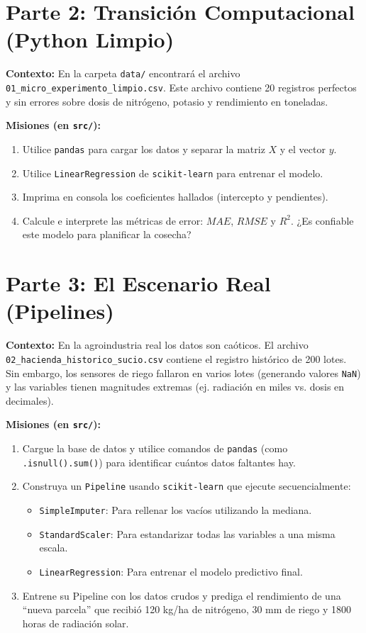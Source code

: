 \documentclass[12pt,a4paper]{article}
\begin{document}
\vspace{1cm}

\section{Parte 2: Transición Computacional (Python Limpio)}

\textbf{Contexto:} En la carpeta \texttt{data/} encontrará el archivo \texttt{01\_micro\_experimento\_limpio.csv}. Este archivo contiene 20 registros perfectos y sin errores sobre dosis de nitrógeno, potasio y rendimiento en toneladas.

\textbf{Misiones (en \texttt{src/}):}
\begin{enumerate}[label=\alph*)]
    \item Utilice \texttt{pandas} para cargar los datos y separar la matriz $X$ y el vector $y$.
    \item Utilice \texttt{LinearRegression} de \texttt{scikit-learn} para entrenar el modelo.
    \item Imprima en consola los coeficientes hallados (intercepto y pendientes).
    \item Calcule e interprete las métricas de error: $MAE$, $RMSE$ y $R^2$. ¿Es confiable este modelo para planificar la cosecha?
\end{enumerate}

\vspace{1cm}

\section{Parte 3: El Escenario Real (Pipelines)}

\textbf{Contexto:} En la agroindustria real los datos son caóticos. El archivo \texttt{02\_hacienda\_historico\_sucio.csv} contiene el registro histórico de 200 lotes. Sin embargo, los sensores de riego fallaron en varios lotes (generando valores \texttt{NaN}) y las variables tienen magnitudes extremas (ej. radiación en miles vs. dosis en decimales).

\textbf{Misiones (en \texttt{src/}):}
\begin{enumerate}[label=\alph*)]
    \item Cargue la base de datos y utilice comandos de \texttt{pandas} (como \texttt{.isnull().sum()}) para identificar cuántos datos faltantes hay.
    \item Construya un \texttt{Pipeline} usando \texttt{scikit-learn} que ejecute secuencialmente:
    \begin{itemize}
        \item \texttt{SimpleImputer}: Para rellenar los vacíos utilizando la mediana.
        \item \texttt{StandardScaler}: Para estandarizar todas las variables a una misma escala.
        \item \texttt{LinearRegression}: Para entrenar el modelo predictivo final.
    \end{itemize}
    \item Entrene su Pipeline con los datos crudos y prediga el rendimiento de una ``nueva parcela'' que recibió 120 kg/ha de nitrógeno, 30 mm de riego y 1800 horas de radiación solar.
\end{enumerate}
\end{document}
